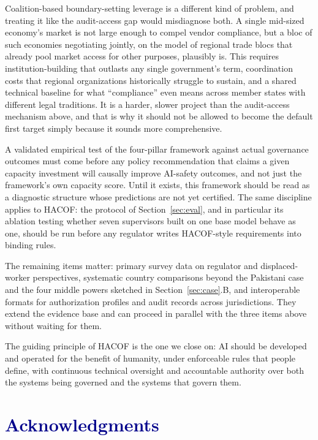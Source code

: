 \documentclass[journal]{IEEEtran}
\newcommand{\hacof}{HACOF}
\begin{document}
Coalition-based boundary-setting leverage is a different kind of problem, and treating it like the audit-access gap would misdiagnose both. A single mid-sized economy's market is not large enough to compel vendor compliance, but a bloc of such economies negotiating jointly, on the model of regional trade blocs that already pool market access for other purposes, plausibly is. This requires institution-building that outlasts any single government's term, coordination costs that regional organizations historically struggle to sustain, and a shared technical baseline for what ``compliance'' even means across member states with different legal traditions. It is a harder, slower project than the audit-access mechanism above, and that is why it should not be allowed to become the default first target simply because it sounds more comprehensive.

A validated empirical test of the four-pillar framework against actual governance outcomes must come before any policy recommendation that claims a given capacity investment will causally improve AI-safety outcomes, and not just the framework's own capacity score. Until it exists, this framework should be read as a diagnostic structure whose predictions are not yet certified. The same discipline applies to \hacof{}: the protocol of Section~\ref{sec:eval}, and in particular its ablation testing whether seven supervisors built on one base model behave as one, should be run before any regulator writes \hacof{}-style requirements into binding rules.

The remaining items matter: primary survey data on regulator and displaced-worker perspectives, systematic country comparisons beyond the Pakistani case and the four middle powers sketched in Section~\ref{sec:case}.B, and interoperable formats for authorization profiles and audit records across jurisdictions. They extend the evidence base and can proceed in parallel with the three items above without waiting for them.

The guiding principle of \hacof{} is the one we close on: AI should be developed and operated for the benefit of humanity, under enforceable rules that people define, with continuous technical oversight and accountable authority over both the systems being governed and the systems that govern them.

\section*{\textcolor{darkblue}{Acknowledgments}}
\end{document}
